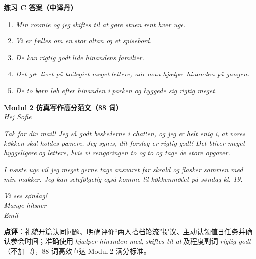 \begin{answerbox}
\textbf{练习 C 答案（中译丹）}
\begin{enumerate}
  \item \textit{Min roomie og jeg skiftes til at gøre stuen rent hver uge.}
  \item \textit{Vi er fælles om en stor altan og et spisebord.}
  \item \textit{De kan rigtig godt lide hinandens familier.}
  \item \textit{Det gør livet på kollegiet meget lettere, når man hjælper hinanden på gangen.}
  \item \textit{De to børn løb efter hinanden i parken og hyggede sig rigtig meget.}
\end{enumerate}

\textbf{Modul 2 仿真写作高分范文（88 词）}\\
\textit{Hej Sofie}

\textit{Tak for din mail! Jeg så godt beskederne i chatten, og jeg er helt enig i, at vores køkken skal holdes pænere. Jeg synes, dit forslag er rigtig godt! Det bliver meget hyggeligere og lettere, hvis vi  rengøringen to og to og  tage de store opgaver.}

\textit{I næste uge vil jeg meget gerne tage ansvaret for skrald og flasker sammen med min makker. Jeg kan selvfølgelig også komme til køkkenmødet på søndag kl. 19.}

\textit{Vi ses søndag!\\
Mange hilsner\\
Emil}

\small\textbf{点评}：礼貌开篇认同问题、明确评价“两人搭档轮流”提议、主动认领值日任务并确认参会时间；准确使用 \textit{hjælper hinanden med}, \textit{skiftes til at} 及程度副词 \textit{rigtig godt}（不加 \textit{-t}），88 词高效直达 Modul 2 满分标准。
\end{answerbox}
